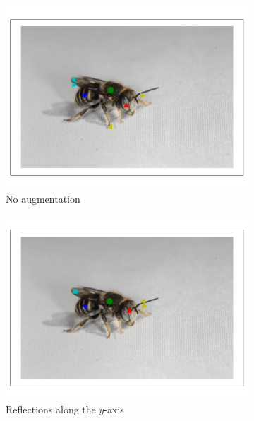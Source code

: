 \documentclass[11pt, oneside]{report}
\begin{document}
        \begin{figure}[p]
            \centering
            \begin{subfigure}[b]{0.45\textwidth}
                \centering
                \includegraphics[width=\textwidth]{7p_1.pdf}
                \caption{No augmentation}
            \end{subfigure}
            \begin{subfigure}[b]{0.45\textwidth}
                \centering
                \includegraphics[width=\textwidth]{refl_1.pdf}
                \caption{Reflections along the $y$-axis}
            \end{subfigure}
            \begin{subfigure}[b]{0.45\textwidth}

\end{subfigure}
\end{figure}
\end{document}
